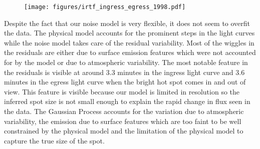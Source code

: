 \documentclass[modern]{aastex62}
\begin{document}
\begin{figure}[ht!]
    \begin{centering}
    \texttt{[image: figures/irtf\_ingress\_egress\_1998.pdf]}
    \end{centering}
\end{figure}

Despite the fact that our noise model is very flexible, it does not seem to overfit the data. 
The physical model accounts for the prominent steps in the light curves while the noise model takes care  of the residual variability. 
Most of the wiggles in the residuals are either due to surface emission features which were not accounted for by the model or due to atmospheric variability.
The most notable feature in the residuals is visible at around 3.3 minutes in the ingress light curve and 3.6 minutes in the egress light curve when the bright hot spot comes in and out of view. 
This feature is visible because our model is limited in resolution so the inferred spot size is not small enough to explain the rapid change in flux seen in the data.
The Gaussian Process accounts for the  variation due to atmospheric variability, the emission due to surface features which are too faint to be well constrained by the physical model and the limitation of the physical model to capture the true size of the spot. 
\end{document}
